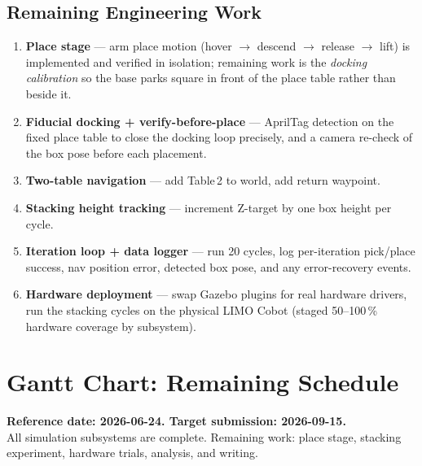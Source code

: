 \documentclass[11pt,a4paper]{article}
\begin{document}
\vspace{0.5em}

\subsection{Remaining Engineering Work}

\begin{enumerate}[label=\textbf{\arabic*.}, leftmargin=1.5em, itemsep=0.3em]
    \item \textbf{Place stage} --- arm place motion (hover $\to$ descend $\to$ release
    $\to$ lift) is implemented and verified in isolation; remaining work is the
    \emph{docking calibration} so the base parks square in front of the place table
    rather than beside it.
    \item \textbf{Fiducial docking + verify-before-place} --- AprilTag detection on the
    fixed place table to close the docking loop precisely, and a camera re-check of the
    box pose before each placement.
    \item \textbf{Two-table navigation} --- add Table\,2 to world, add return waypoint.
    \item \textbf{Stacking height tracking} --- increment Z-target by one box height
    per cycle.
    \item \textbf{Iteration loop + data logger} --- run 20 cycles, log per-iteration
    pick/place success, nav position error, detected box pose, and any error-recovery
    events.
    \item \textbf{Hardware deployment} --- swap Gazebo plugins for real hardware drivers,
    run the stacking cycles on the physical LIMO Cobot (staged 50--100\,\% hardware
    coverage by subsystem).
\end{enumerate}

\newpage

\section{Gantt Chart: Remaining Schedule}

\textbf{Reference date: 2026-06-24. Target submission: 2026-09-15.}\\[0.5em]
All simulation subsystems are complete. Remaining work: place stage, stacking
experiment, hardware trials, analysis, and writing.

\vspace{1em}
\end{document}

